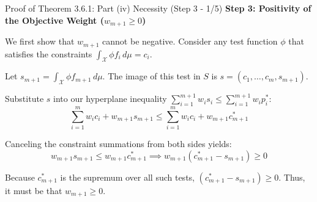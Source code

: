 \documentclass[10pt, aspectratio=169, xcolor=dvipsnames]{beamer}
\newcommand{\lead}[1]{{\color{UniBlue}\bfseries #1}}
\begin{document}
\begin{frame}{Proof of Theorem 3.6.1: Part (iv) Necessity (Step 3 - 1/5)}
    \lead{Step 3: Positivity of the Objective Weight ($w_{m+1} \ge 0$)}\\
    \vspace{0.4cm}
    
    We first show that $w_{m+1}$ cannot be negative. Consider any test function $\phi$ that satisfies the constraints $\int_{\mathcal{X}} \phi f_i \, d\mu = c_i$. 
    
    \vspace{0.2cm}
    Let $s_{m+1} = \int_{\mathcal{X}} \phi f_{m+1} \, d\mu$. The image of this test in $S$ is $s = (c_1, \dots, c_m, s_{m+1})$.
    
    \vspace{0.2cm}
    Substitute $s$ into our hyperplane inequality $\sum_{i=1}^{m+1} w_i s_i \le \sum_{i=1}^{m+1} w_i p^*_i$:
    \[ \sum_{i=1}^m w_i c_i + w_{m+1} s_{m+1} \le \sum_{i=1}^m w_i c_i + w_{m+1} c^*_{m+1} \]
    
    \vspace{0.2cm}
    Canceling the constraint summations from both sides yields:
    \[ w_{m+1} s_{m+1} \le w_{m+1} c^*_{m+1} \implies w_{m+1}(c^*_{m+1} - s_{m+1}) \ge 0 \]
    
    \vspace{0.2cm}
    Because $c^*_{m+1}$ is the supremum over all such tests, $(c^*_{m+1} - s_{m+1}) \ge 0$. Thus, it must be that $w_{m+1} \ge 0$.
\end{frame}
\end{document}
